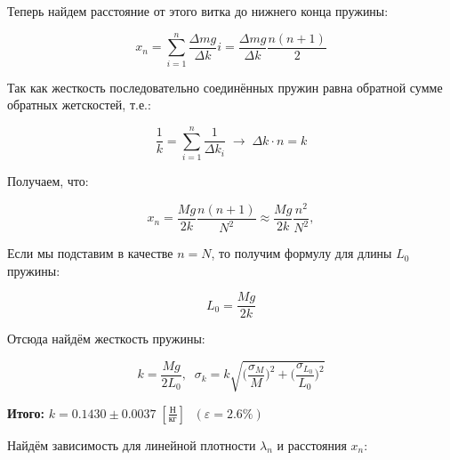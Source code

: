 \documentclass[a4paper, 12pt]{article}
\begin{document}
\bigskip

Теперь найдем расстояние от этого витка до нижнего конца пружины:

\bigskip

\begin{equation}
    x_{n} = \sum_{i=1}^{n} \frac{\varDelta m g}{\varDelta k} i = \frac{\varDelta mg}{\varDelta k} \frac{n(n+1)}{2} 
\end{equation}

\bigskip

Так как жесткость последовательно соединённых пружин равна обратной сумме обратных жетскостей, т.е.:

\bigskip

\begin{equation}
    \frac{1}{k} = \sum_{i = 1}^{n} \frac{1}{\varDelta k_{i}} \; \rightarrow \; \varDelta k \cdot n = k
\end{equation}

Получаем, что:

\bigskip

\begin{equation}
    x_{n} = \frac{Mg}{2k} \frac{n(n+1)}{N^2} \approx \frac{Mg}{2k} \frac{n^2}{N^2},
\end{equation}

\bigskip

Если мы подставим в качестве $ n = N $, то получим формулу для длины $ L_{0} $ пружины:

\bigskip

\begin{equation}  
    L_{0} = \frac{Mg}{2k} \label{length} 
\end{equation}  

\bigskip

Отсюда найдём жесткость пружины:

\bigskip

\begin{equation}
    k = \frac{Mg}{2L_{0}}, \; \;
    \sigma_{k} = k \sqrt{\bigg(\frac{\sigma_{M}}{M}\bigg)^2 + \bigg(\frac{\sigma_{L_{0}}}{L_{0}}\bigg)^2}
\end{equation}

\bigskip

\begin{center}
    \textbf{Итого:} \underline{$ k = 0.1430 \pm 0.0037 \; [\frac{\text{Н}}{\text{кг}}] $} $ \; (\varepsilon = 2.6 \%) $  
\end{center}

\bigskip

Найдём зависимость для линейной плотности $ \lambda_{n} $ и расстояния $ x_{n} $:
\end{document}
